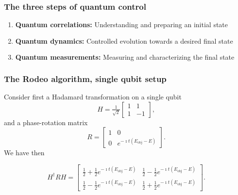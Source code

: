 \documentclass{beamer}
\begin{document}
\begin{frame}
\frametitle{The three steps of quantum control}
\begin{enumerate}
\item {\bf Quantum correlations:} Understanding and preparing an initial state
\item {\bf Quantum dynamics:} Controlled evolution towards a desired final state
\item {\bf Quantum measurements:} Measuring and characterizing the final state
\end{enumerate}
\end{frame}



\begin{frame}
\frametitle{The Rodeo algorithm, single qubit setup}
Consider first a Hadamard transformation on a single qubit
\[
H=\tfrac{1}{\sqrt{2}}\begin{bmatrix} 1 & 1 \\ 1 & -1\end{bmatrix},
\]
and a phase-rotation matrix
\[
R=\begin{bmatrix} 1 & 0 \\ 0 & e^{-\imath t(E_{\mathrm{obj}}-E)}\end{bmatrix}.
\]
We have then

\[
H^{\dagger}RH=\begin{bmatrix} \tfrac{1}{2}+\tfrac{1}{2}e^{-\imath t(E_{\mathrm{obj}}-E)} & \tfrac{1}{2}-\tfrac{1}{2}e^{-\imath t(E_{\mathrm{obj}}-E)} \\ \tfrac{1}{2}-\tfrac{1}{2}e^{-\imath t(E_{\mathrm{obj}}-E)}  & \tfrac{1}{2}+\tfrac{1}{2}e^{-\imath t(E_{\mathrm{obj}}-E)}\end{bmatrix}.
\]
\end{frame}
\end{document}
